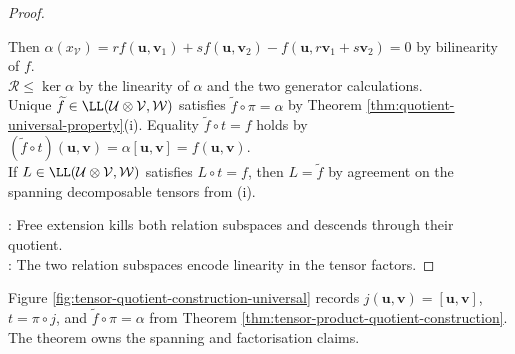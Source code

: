 \begin{theorem}
\begin{proof}
\begin{enumerate}[label=(\roman*)]
Then $\alpha(x_{\mathcal{V}})=rf(\mathbf{u},\mathbf{v}_1)+sf(\mathbf{u},\mathbf{v}_2)-f(\mathbf{u},r\mathbf{v}_1+s\mathbf{v}_2)=0$ by bilinearity of $f$.\\
$\mathcal{R}\leq\ker\alpha$ by the linearity of $\alpha$ and the two generator calculations.\\
Unique $\widetilde{f}\in\LL(\mathcal{U}\otimes\mathcal{V},\mathcal{W})$ satisfies $\widetilde{f}\circ\pi=\alpha$ by Theorem \ref{thm:quotient-universal-property}(i). Equality $\widetilde{f}\circ t=f$ holds by $(\widetilde{f}\circ t)(\mathbf{u},\mathbf{v})=\alpha[\mathbf{u},\mathbf{v}]=f(\mathbf{u},\mathbf{v})$.\\
If $L\in\LL(\mathcal{U}\otimes\mathcal{V},\mathcal{W})$ satisfies $L\circ t=f$, then $L=\widetilde{f}$ by agreement on the spanning decomposable tensors from (i).
\end{enumerate}
: Free extension kills both relation subspaces and descends through their quotient.\\
: The two relation subspaces encode linearity in the tensor factors.
\end{proof}
\end{theorem}

\begin{illustrationfigure}[H]
  \centering
  
  \caption{The free linear map $\alpha$ kills $\mathcal{R}$, so it descends uniquely to $\widetilde{f}:\mathcal{U}\otimes\mathcal{V}\to\mathcal{W}$.}
  \label{fig:tensor-quotient-construction-universal}
\end{illustrationfigure}

Figure \ref{fig:tensor-quotient-construction-universal} records $j(\mathbf{u},\mathbf{v})=[\mathbf{u},\mathbf{v}]$, $t=\pi\circ j$, and $\widetilde{f}\circ\pi=\alpha$ from Theorem \ref{thm:tensor-product-quotient-construction}.\\
The theorem owns the spanning and factorisation claims.

